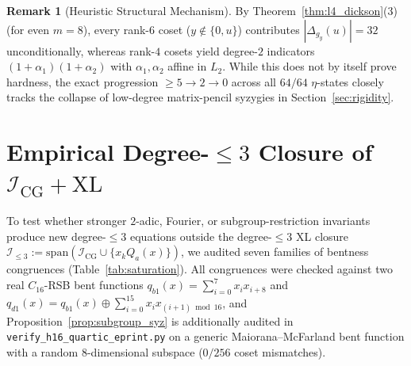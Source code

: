 \documentclass[11pt,a4paper]{article}
\theoremstyle{definition}
\newtheorem{remark}[theorem]{Remark}
\begin{document}
\begin{table}[t]
\centering
\caption{Antipodal dual-subspace dimensions (Definition~\ref{def:layers}) vs.\ shear blocks $(W, T, R_F)$ and full echelon anatomy of $\mathcal{I}_{\mathrm{CG}}$ at fixed $\eta$ (\texttt{SOLVE\_STEP71A}, \texttt{SOLVE\_STEP71C}). Here $L_{23} := L_2+L_3$ and $L_{234} := L_2+L_3+L_4$ restricted to fixed-$\eta$ active variables.}
\label{tab:layers}
\end{table}

\begin{remark}[Heuristic Structural Mechanism]
By Theorem~\ref{thm:l4_dickson}(3) (for even $m=8$), every rank-$6$ coset ($y \notin \{0,u\}$) contributes $|\Delta_{g_y}(u)| = 32$ unconditionally, whereas rank-$4$ cosets yield degree-$2$ indicators $(1+\alpha_1)(1+\alpha_2)$ with $\alpha_1, \alpha_2$ affine in $L_2$. While this does not by itself prove hardness, the exact progression $\ge 5 \to 2 \to 0$ across all $64/64$ $\eta$-states closely tracks the collapse of low-degree matrix-pencil syzygies in Section~\ref{sec:rigidity}.
\end{remark}

\section{Empirical Degree-$\le 3$ Closure of $\mathcal{I}_{\mathrm{CG}}+\mathrm{XL}$}
\label{sec:saturation}

To test whether stronger $2$-adic, Fourier, or subgroup-restriction invariants produce new degree-$\le 3$ equations outside the degree-$\le 3$ XL closure $\mathcal{I}_{\le 3} := \mathrm{span}(\mathcal{I}_{\mathrm{CG}} \cup \{x_k Q_a(x)\})$, we audited seven families of bentness congruences (Table~\ref{tab:saturation}). All congruences were checked against two real $C_{16}$-RSB bent functions $q_{b1}(x) = \sum_{i=0}^7 x_i x_{i+8}$ and $q_{d1}(x) = q_{b1}(x) \oplus \sum_{i=0}^{15} x_i x_{(i+1)\bmod 16}$, and Proposition~\ref{prop:subgroup_syz} is additionally audited in \texttt{verify\_h16\_quartic\_eprint.py} on a generic Maiorana--McFarland bent function with a random $8$-dimensional subspace ($0/256$ coset mismatches).
\end{document}
